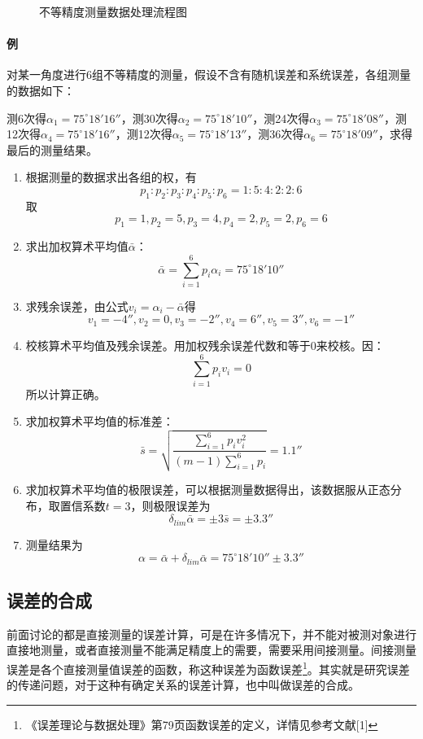 \begin{figure}[H]
	\caption{不等精度测量数据处理流程图}
\end{figure}
\paragraph{例}对某一角度进行6组不等精度的测量，假设不含有随机误差和系统误差，各组测量的数据如下：

测6次得$ \alpha_1=75^\circ18'16'' $，测30次得$ \alpha_2=75^\circ18'10'' $，测24次得$ \alpha_3=75^\circ18'08'' $，测12次得$ \alpha_4=75^\circ18'16'' $，测12次得$ \alpha_5=75^\circ18'13'' $，测36次得$ \alpha_6=75^\circ18'09'' $，求得最后的测量结果。
\begin{enumerate}
	\item 根据测量的数据求出各组的权，有\[ p_1:p_2:p_3:p_4:p_5:p_6=1:5:4:2:2:6 \]取\[ p_1=1,p_2=5,p_3=4,p_4=2,p_5=2,p_6=6 \]
	\item 求出加权算术平均值$ \bar{\alpha} $：\[ \bar{\alpha}=\sum_{i=1}^{6}p_i\alpha_i=75^\circ18'10'' \]
	\item 求残余误差，由公式$ v_i=\alpha_i-\bar{\alpha} $得\[ v_1=-4'',v_2=0,v_3=-2'',v_4=6'',v_5=3'',v_6=-1'' \]
	\item 校核算术平均值及残余误差。用加权残余误差代数和等于0来校核。因：\[ \sum_{i=1}^{6}p_iv_i=0 \]所以计算正确。
	\item 求加权算术平均值的标准差：\[ \bar{s}=\sqrt{\frac{\sum\limits_{i=1}^{6}p_iv_i^2}{(m-1)\sum\limits_{i=1}^{6}p_i}}=1.1'' \]
	\item 求加权算术平均值的极限误差，可以根据测量数据得出，该数据服从正态分布，取置信系数$ t=3 $，则极限误差为\[ \delta_{lim}\bar{\alpha}=\pm3\bar{s}=\pm3.3'' \]
	\item 测量结果为\[ \alpha=\bar{\alpha}+\delta_{lim}\bar{\alpha}=75^\circ18'10''\pm3.3'' \]
\end{enumerate}
\subsection{误差的合成}
前面讨论的都是直接测量的误差计算，可是在许多情况下，并不能对被测对象进行直接地测量，或者直接测量不能满足精度上的需要，需要采用间接测量。间接测量误差是各个直接测量值误差的函数，称这种误差为函数误差\footnote{《误差理论与数据处理》第79页函数误差的定义，详情见参考文献[1]}。其实就是研究误差的传递问题，对于这种有确定关系的误差计算，也中叫做误差的合成。

